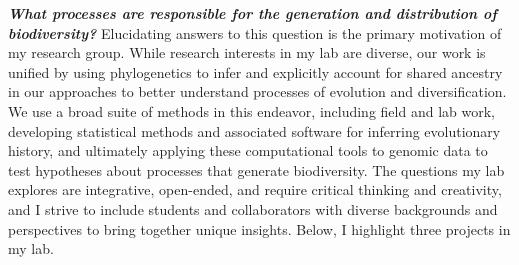 \textbf{\textit{What processes are responsible for the generation and
        distribution of biodiversity?}}
Elucidating answers to this question
is the primary
motivation of my research group.
While research interests in my lab are diverse, our work is unified by
using
phylogenetics to infer and explicitly account for shared ancestry in our
approaches to better understand processes of evolution and diversification.
We use a broad suite of methods in this endeavor, including
field and lab work,
developing statistical methods and associated software for inferring evolutionary history,
and ultimately applying these computational tools to genomic data to test
hypotheses about processes that generate biodiversity.
The questions my lab explores are integrative, open-ended, and require critical
thinking and creativity,
and
I strive to include students and collaborators with diverse backgrounds and
perspectives to bring together unique insights.
Below, I highlight three projects in my lab.


